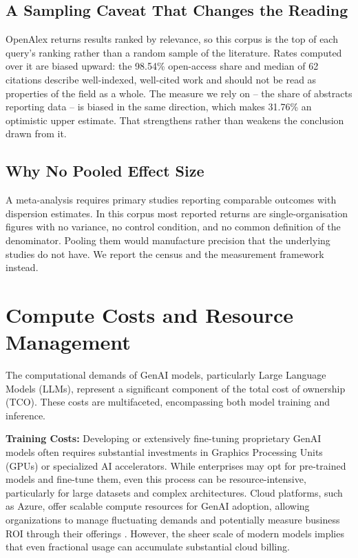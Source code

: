 \documentclass[10pt,twocolumn,letterpaper]{article}
\begin{document}
\subsection{A Sampling Caveat That Changes the Reading}


OpenAlex returns results ranked by relevance, so this corpus is the top of each query's ranking rather than a random sample of the literature. Rates computed over it are biased upward: the 98.54\% open-access share and median of 62 citations describe well-indexed, well-cited work and should not be read as properties of the field as a whole. The measure we rely on -- the share of abstracts reporting data -- is biased in the same direction, which makes 31.76\% an optimistic upper estimate. That strengthens rather than weakens the conclusion drawn from it.


\subsection{Why No Pooled Effect Size}


A meta-analysis requires primary studies reporting comparable outcomes with dispersion estimates. In this corpus most reported returns are single-organisation figures with no variance, no control condition, and no common definition of the denominator. Pooling them would manufacture precision that the underlying studies do not have. We report the census and the measurement framework instead.



\section{Compute Costs and Resource Management}


The computational demands of GenAI models, particularly Large Language Models (LLMs), represent a significant component of the total cost of ownership (TCO). These costs are multifaceted, encompassing both model training and inference.

\textbf{Training Costs:} Developing or extensively fine-tuning proprietary GenAI models often requires substantial investments in Graphics Processing Units (GPUs) or specialized AI accelerators. While enterprises may opt for pre-trained models and fine-tune them, even this process can be resource-intensive, particularly for large datasets and complex architectures. Cloud platforms, such as Azure, offer scalable compute resources for GenAI adoption, allowing organizations to manage fluctuating demands and potentially measure business ROI through their offerings \cite{openalex_w7138188291}. However, the sheer scale of modern models implies that even fractional usage can accumulate substantial cloud billing.
\end{document}
